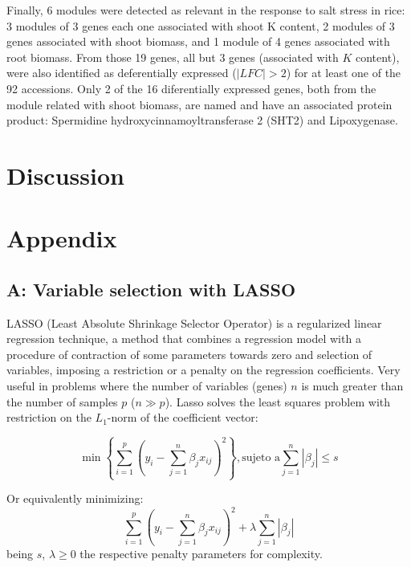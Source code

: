 \documentclass[12pt,journal, onecolumn]{IEEEtran}
\newcommand{\abs}[1]{\left\vert#1\right\vert}
\begin{document}
Finally, 6 modules were detected as relevant in the response to salt stress in rice: 3 modules of 3 genes each one associated with shoot K content, 2 modules of 3 genes associated with  shoot biomass, and 1 module of 4 genes associated with root biomass.
From those 19 genes, all but 3 genes (associated with $K$ content), were also identified as deferentially expressed ($|LFC| > 2$) for at least one of the 92 accessions. Only 2 of the 16 diferentially expressed genes, both from the module related with shoot biomass, are named and have an associated protein product: Spermidine hydroxycinnamoyltransferase 2 (SHT2) and Lipoxygenase.


\section{Discussion}





\newpage
\section*{Appendix}
\subsection{A: Variable selection with LASSO}
LASSO (Least Absolute Shrinkage Selector Operator) is a regularized linear regression technique, a method that combines a regression model with a procedure of contraction of some parameters towards zero and selection of variables, imposing a restriction or a penalty on the regression coefficients. Very useful in problems where the number of variables (genes) $ n $ is much greater than the number of samples $ p $ ($ n \gg p $). Lasso solves the least squares problem with restriction on the $ L_1$-norm of the coefficient vector:

\begin{equation}
\min \left\lbrace\sum_{i=1}^{p}{\left( y_i-\sum_{j=1}^n{\beta_j x_{ij}}\right)^2} \right\rbrace , \textrm{sujeto a} \sum_{j=1}^n\abs{\beta_j}\leq s
\end{equation}

Or equivalently minimizing:
\begin{equation}
\sum_{i=1}^{p}{\left( y_i-\sum_{j=1}^n{\beta_j x_{ij}}\right)^2} + \lambda \sum_{j=1}^n\abs{\beta_j}
\end{equation}
being $ s $, $ \lambda \geq 0 $ the respective penalty parameters for complexity.\\
\end{document}

